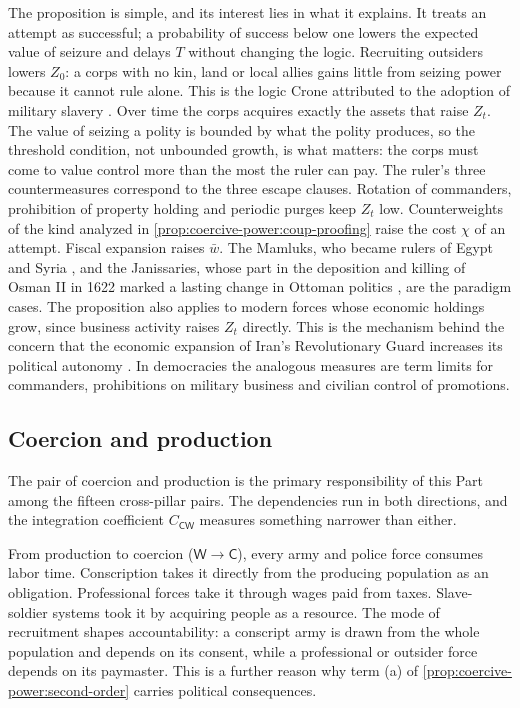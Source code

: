 \documentclass[11pt,letterpaper]{article}
\theoremstyle{definition}
\theoremstyle{remark}
\newcommand{\pC}{\mathsf{C}}
\newcommand{\pW}{\mathsf{W}}
\begin{document}
The proposition is simple, and its interest lies in what it explains. It treats an attempt as successful; a probability of success below one lowers the expected value of seizure and delays $T$ without changing the logic. Recruiting outsiders lowers $Z_0$: a corps with no kin, land or local allies gains little from seizing power because it cannot rule alone. This is the logic Crone attributed to the adoption of military slavery \citep{crone1980}. Over time the corps acquires exactly the assets that raise $Z_t$. The value of seizing a polity is bounded by what the polity produces, so the threshold condition, not unbounded growth, is what matters: the corps must come to value control more than the most the ruler can pay. The ruler's three countermeasures correspond to the three escape clauses. Rotation of commanders, prohibition of property holding and periodic purges keep $Z_t$ low. Counterweights of the kind analyzed in \cref{prop:coercive-power:coup-proofing} raise the cost $\chi$ of an attempt. Fiscal expansion raises $\bar{w}$. The Mamluks, who became rulers of Egypt and Syria \citep{irwin1986}, and the Janissaries, whose part in the deposition and killing of Osman II in 1622 marked a lasting change in Ottoman politics \citep{tezcan2010}, are the paradigm cases. The proposition also applies to modern forces whose economic holdings grow, since business activity raises $Z_t$ directly. This is the mechanism behind the concern that the economic expansion of Iran's Revolutionary Guard increases its political autonomy \citep{wehrey2009,alfoneh2013}. In democracies the analogous measures are term limits for commanders, prohibitions on military business and civilian control of promotions.

\subsection{Coercion and production}
\label{sec:cw}

The pair of coercion and production is the primary responsibility of this Part among the fifteen cross-pillar pairs. The dependencies run in both directions, and the integration coefficient $C_{\pC\pW}$ measures something narrower than either.

From production to coercion ($\pW \to \pC$), every army and police force consumes labor time. Conscription takes it directly from the producing population as an obligation. Professional forces take it through wages paid from taxes. Slave-soldier systems took it by acquiring people as a resource. The mode of recruitment shapes accountability: a conscript army is drawn from the whole population and depends on its consent, while a professional or outsider force depends on its paymaster. This is a further reason why term (a) of \cref{prop:coercive-power:second-order} carries political consequences.
\end{document}
